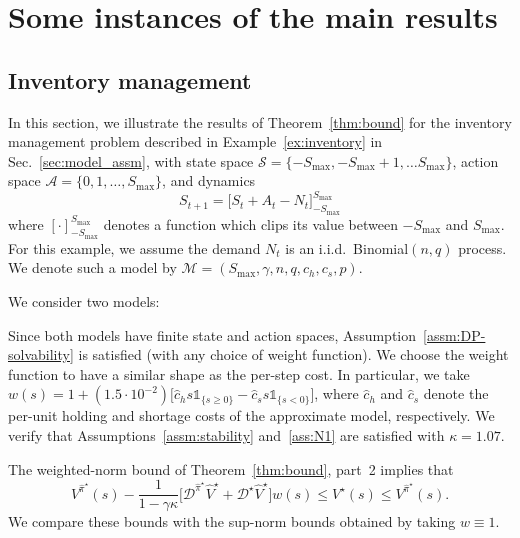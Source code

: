\documentclass[letterpaper, 10pt]{IEEEtran}
\newcommand*\ALPHABET{\mathcal}
\newcommand*\IND{\mathds{1}}
\newcommand*\MISMATCH{\mathscr{D}}
\begin{document}
\section{Some instances of the main results}

\subsection{Inventory management}\label{sec:inventory}
In this section, we illustrate the results of Theorem~\ref{thm:bound} for the inventory management problem described in Example~\ref{ex:inventory} in Sec.~\ref{sec:model_assm}, with state space $\ALPHABET S = \{ -S_{\max}, -S_{\max} + 1, \dots S_{\max} \}$, action space $\ALPHABET A = \{0, 1, \dots, S_{\max} \}$, and dynamics
\[
    S_{t+1} = \bigl[S_t + A_t - N_t\bigr]_{-S_{\max}}^{S_{\max}}
\]
where $[ \cdot ]_{-S_{\max}}^{S_{\max}}$ denotes a function which clips its value between $-S_{\max}$ and $S_{\max}$. 
     For this example, we assume the demand $N_t$ is an i.i.d.\ Binomial$(n,q)$ process.
We denote such a model by $\ALPHABET M = (S_{\max}, \gamma, n, q, c_h, c_s, p)$. 

We consider two models:
\vspace*{-0.35\baselineskip}
\vspace*{-0.35\baselineskip}
Since both models have finite state and action spaces, Assumption~\ref{assm:DP-solvability} is satisfied (with any choice of  weight function). We choose the weight function to have a similar shape as the per-step cost. In particular, we take $w(s) = 1 + (1.5 \cdot 10^{-2}) \bigl[\hat{c}_h s \IND_{\{s \ge 0 \}} - \hat{c}_s s \IND_{\{s < 0\}}\bigr]$, where $\hat{c}_h$ and $\hat{c}_s$ denote the per-unit holding and shortage costs of the approximate model, respectively. We verify that Assumptions~\ref{assm:stability} and~\ref{ass:N1} are satisfied with $\kappa = 1.07$.

The weighted-norm bound of Theorem~\ref{thm:bound}, part~2 implies that
\begin{equation}
   V^{\hat \pi^\star}(s) 
   - 
    \frac{1}{1- \gamma \kappa} 
   \bigl[ \MISMATCH^{\hat \pi^\star} \hat V^\star +   \MISMATCH^\star \hat V^\star \bigr] 
   w(s)
   \le
   V^\star(s) 
   \le
   V^{\hat \pi^\star}(s).
   \label{eq:IM-bound-w}
\end{equation}
We compare these bounds with the sup-norm bounds obtained by taking $w \equiv 1$.
\end{document}
